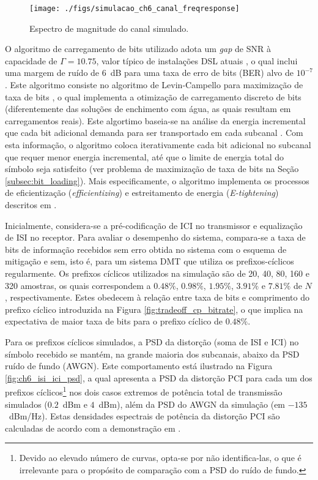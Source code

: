 \begin{figure}[htbp]
\centering
\texttt{[image: ./figs/simulacao\_ch6\_canal\_freqresponse]}
\caption{Espectro de magnitude do canal simulado.
\label{fig:ch6_canal_freqresponse}}
\end{figure}

O algoritmo de carregamento de bits utilizado adota um \textsl{gap} de SNR à capacidade de  $\Gamma = 10.75$, valor típico de instalações DSL atuais \cite{maes2012}, o qual inclui uma margem de ruído de $6$~dB para uma taxa de erro de bits (BER) alvo de $10^{-7}$. Este algoritmo consiste no algoritmo de Levin-Campello para maximização de taxa de bits \cite{campello1999}, o qual implementa a otimização de carregamento discreto de bits (diferentemente das soluções de enchimento com água, as quais resultam em carregamentos reais). Este algortimo baseia-se na análise da energia incremental que cada bit adicional demanda para ser transportado em cada subcanal \cite{ee379c}. Com esta informação, o algoritmo coloca iterativamente cada bit adicional no subcanal que requer menor energia incremental, até que o limite de energia total do símbolo seja satisfeito (ver problema de maximização de taxa de bits na Seção \ref{subsec:bit_loading}). Mais especificamente, o algoritmo implementa os processos de eficientização (\emph{efficientizing}) e estreitamento de energia (\emph{E-tightening}) descritos em \cite{ee379c,campelloisit1998}.

Inicialmente, considera-se a pré-codificação de ICI no transmissor e equalização de ISI no receptor. Para avaliar o desempenho do sistema, compara-se a taxa de bits de informação recebidos sem erro obtida no sistema com o esquema de mitigação e sem, isto é, para um sistema DMT que utiliza os prefixos-cíclicos regularmente. Os prefixos cíclicos utilizados na simulação são de 20, 40, 80, 160 e 320 amostras, os quais correspondem a $0.48\%$, $0.98\%$, $1.95\%$, $3.91\%$ e $7.81\%$ de $N$, respectivamente. Estes obedecem à relação entre taxa de bits e comprimento do prefixo cíclico introduzida na Figura \ref{fig:tradeoff_cp_bitrate}, o que implica na expectativa de maior taxa de bits para o prefixo cíclico de $0.48\%$. 

Para os prefixos cíclicos simulados, a PSD da distorção (soma de ISI e ICI) no símbolo recebido se mantém, na grande maioria dos subcanais, abaixo da PSD ruído de fundo (AWGN). Este comportamento está ilustrado na Figura \ref{fig:ch6_isi_ici_psd}, a qual apresenta a PSD da distorção PCI para cada um dos prefixos cíclicos\footnote{Devido ao elevado número de curvas, opta-se por não identifica-las, o que é irrelevante para o propósito de comparação com a PSD do ruído de fundo.} nos dois casos extremos de potência total de transmissão simulados ($0.2$~dBm e $4$~dBm), além da PSD do AWGN da simulação (em $-135$~dBm/Hz). Estas densidades espectrais de potência da distorção PCI são calculadas de acordo com a demonstração em \cite{perodling2002}. 

